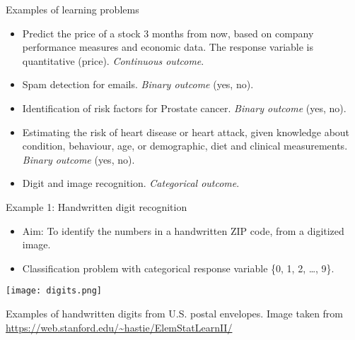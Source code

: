\documentclass[ignorenonframetext,]{beamer}
\providecommand{\tightlist}{%
  \setlength{\itemsep}{0pt}\setlength{\parskip}{0pt}}
\begin{document}
\begin{frame}{Examples of learning problems}
\protect\hypertarget{examples-of-learning-problems}{}

\begin{itemize}
\item
  Predict the price of a stock 3 months from now, based on company
  performance measures and economic data. The response variable is
  quantitative (price). \emph{Continuous outcome}.
\item
  Spam detection for emails. \emph{Binary outcome} (yes, no).
\item
  Identification of risk factors for Prostate cancer. \emph{Binary
  outcome} (yes, no).
\item
  Estimating the risk of heart disease or heart attack, given knowledge
  about condition, behaviour, age, or demographic, diet and clinical
  measurements. \emph{Binary outcome} (yes, no).
\item
  Digit and image recognition. \emph{Categorical outcome}.
\end{itemize}

\end{frame}

\begin{frame}

\begin{block}{Example 1: Handwritten digit recognition}

\begin{itemize}
\tightlist
\item
  Aim: To identify the numbers in a handwritten ZIP code, from a
  digitized image.
\item
  Classification problem with categorical response variable \{0, 1, 2,
  \ldots{}, 9\}. \vspace{1mm}
\end{itemize}

\centering

\texttt{[image: digits.png]}
\vspace{1mm}

\flushleft

Examples of handwritten digits from U.S. postal envelopes. \scriptsize
Image taken from \url{https://web.stanford.edu/~hastie/ElemStatLearnII/}

\end{block}

\end{frame}
\end{document}
